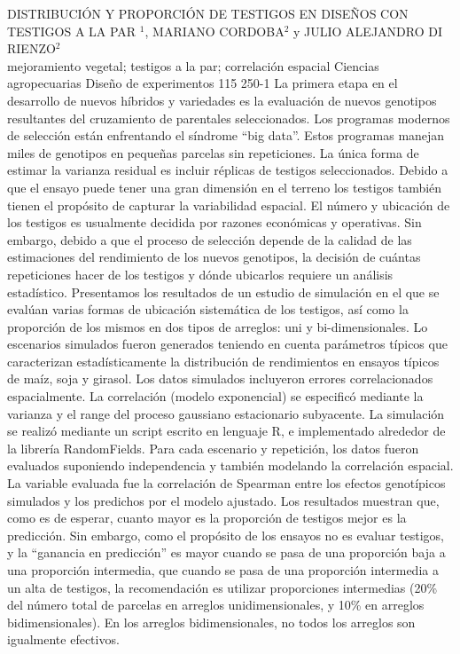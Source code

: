 \A
{DISTRIBUCIÓN Y PROPORCIÓN DE TESTIGOS EN DISEÑOS CON TESTIGOS A LA PAR}
{$^1$, MARIANO CORDOBA$^2$ y JULIO ALEJANDRO DI RIENZO$^2$}
{
\\}
{mejoramiento vegetal; testigos a la par; correlación espacial} 
 {Ciencias agropecuarias} 
 {Diseño de experimentos} 
 {115} 
 {250-1}
{La primera etapa en el desarrollo de nuevos híbridos y variedades es la evaluación de nuevos genotipos resultantes del cruzamiento de parentales seleccionados. Los programas modernos de selección están enfrentando el síndrome “big data”. Estos programas manejan miles de genotipos en pequeñas parcelas sin repeticiones. La única forma de estimar la varianza residual es incluir réplicas de testigos seleccionados. Debido a que el ensayo puede tener una gran dimensión en el terreno los testigos también tienen el propósito de capturar la variabilidad espacial. El número y ubicación de los testigos es usualmente decidida por razones económicas y operativas. Sin embargo, debido a que el proceso de selección depende de la calidad de las estimaciones del rendimiento de los nuevos genotipos, la decisión de cuántas repeticiones hacer de los testigos y dónde ubicarlos requiere un análisis estadístico. Presentamos los resultados de un estudio de simulación en el que se evalúan varias formas de ubicación sistemática de los testigos, así como la proporción de los mismos en dos tipos de arreglos: uni y bi-dimensionales. Lo escenarios simulados fueron generados teniendo en cuenta parámetros típicos que caracterizan estadísticamente la distribución de rendimientos en ensayos típicos de maíz, soja y girasol. Los datos simulados incluyeron errores correlacionados espacialmente. La correlación (modelo exponencial) se especificó mediante la varianza y el range del proceso gaussiano estacionario subyacente. La simulación se realizó mediante un script escrito en lenguaje R, e implementado alrededor de la librería RandomFields. Para cada escenario y repetición, los datos fueron evaluados suponiendo independencia y también modelando la correlación espacial. La variable evaluada fue la correlación de Spearman entre los efectos genotípicos simulados y los predichos por el modelo ajustado. Los resultados muestran que, como es de esperar, cuanto mayor es la proporción de testigos mejor es la predicción. Sin embargo, como el propósito de los ensayos no es evaluar testigos, y la “ganancia en predicción” es mayor cuando se pasa de una proporción baja a una proporción intermedia, que cuando se pasa de una proporción intermedia a un alta de testigos, la recomendación es utilizar proporciones intermedias (20\% del número total de parcelas en arreglos unidimensionales, y 10\% en arreglos bidimensionales). En los arreglos bidimensionales, no todos los arreglos son igualmente efectivos. }
